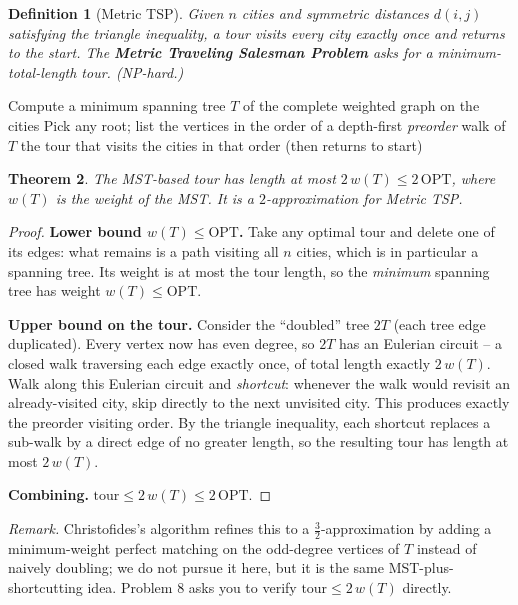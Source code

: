 \documentclass[11pt]{article}
\newtheorem{theorem}{Theorem}[section]
\newtheorem{definition}[theorem]{Definition}
\begin{document}
\begin{definition}[Metric TSP]
Given $n$ cities and symmetric distances $d(i,j)$ satisfying the triangle inequality, a
\emph{tour} visits every city exactly once and returns to the start. The
\textbf{Metric Traveling Salesman Problem} asks for a minimum-total-length tour. (NP-hard.)
\end{definition}

\begin{algorithm}[h]
\caption{MST-Based Metric TSP $2$-Approximation (Problem 8)}
\begin{algorithmic}[1]
\State Compute a minimum spanning tree $T$ of the complete weighted graph on the cities
\State Pick any root; list the vertices in the order of a depth-first \emph{preorder} walk of $T$
\State \Return the tour that visits the cities in that order (then returns to start)
\end{algorithmic}
\end{algorithm}

\begin{theorem}
\label{thm:tsp}
The MST-based tour has length at most $2\,w(T) \le 2\,\mathrm{OPT}$, where $w(T)$ is the
weight of the MST. It is a $2$-approximation for Metric TSP.
\end{theorem}

\begin{proof}
\textbf{Lower bound $w(T) \le \mathrm{OPT}$.} Take any optimal tour and delete one of its
edges: what remains is a path visiting all $n$ cities, which is in particular a spanning
tree. Its weight is at most the tour length, so the \emph{minimum} spanning tree has
weight $w(T) \le \mathrm{OPT}$.

\textbf{Upper bound on the tour.} Consider the ``doubled'' tree $2T$ (each tree edge
duplicated). Every vertex now has even degree, so $2T$ has an Eulerian circuit -- a closed
walk traversing each edge exactly once, of total length exactly $2\,w(T)$. Walk along this
Eulerian circuit and \emph{shortcut}: whenever the walk would revisit an
already-visited city, skip directly to the next unvisited city. This produces exactly the
preorder visiting order. By the triangle inequality, each shortcut replaces a sub-walk by
a direct edge of no greater length, so the resulting tour has length at most $2\,w(T)$.

\textbf{Combining.} $\text{tour} \le 2\,w(T) \le 2\,\mathrm{OPT}$.
\end{proof}

\noindent\emph{Remark.} Christofides's algorithm refines this to a $\tfrac{3}{2}$-approximation
by adding a minimum-weight perfect matching on the odd-degree vertices of $T$ instead of
naively doubling; we do not pursue it here, but it is the same MST-plus-shortcutting idea.
Problem 8 asks you to verify $\text{tour} \le 2\,w(T)$ directly.
\end{document}
